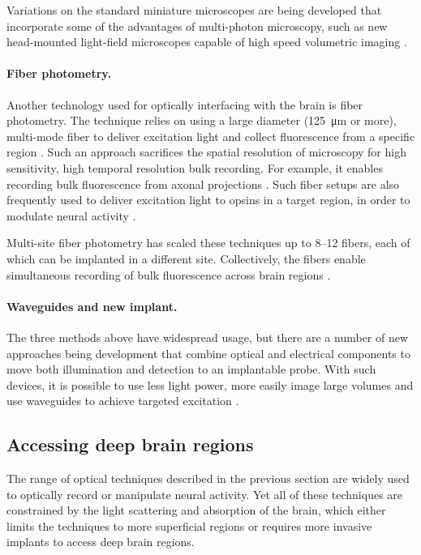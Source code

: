 Variations on the standard miniature microscopes are being 
developed that incorporate some of the advantages of multi-photon
microscopy, such as new head-mounted light-field microscopes 
capable of high speed volumetric imaging \cite{Skocek:2018hs}.

\paragraph{Fiber photometry.} Another technology used 
for optically interfacing with the brain is fiber photometry. 
The technique relies on using a large diameter 
(125~\si{\micro\meter} or more), multi-mode fiber to 
deliver excitation light and collect fluorescence from a 
specific region 
\cite{Adelsberger:2005dy,Cui:2013dq,Adelsberger:2014jd}.
Such an approach sacrifices the spatial resolution of 
microscopy for high sensitivity, high temporal resolution 
bulk recording. For example, it enables recording bulk 
fluorescence from axonal projections \cite{Gunaydin:2014dh}. 
Such fiber setups are also frequently used to deliver 
excitation light to opsins in a target region, in order
to modulate neural activity \cite{Warden:2014bx}.

Multi-site fiber photometry has scaled these techniques up to 
8--12 fibers, each of which can be implanted in a different site.
Collectively, the fibers enable simultaneous recording of bulk 
fluorescence across brain regions \cite{Guo:2015gu}.

\paragraph{Waveguides and new implant.} The three methods 
above have widespread usage, but there are a number of new 
approaches being development that combine optical and electrical 
components to move both illumination and detection to an implantable probe.
With such devices, it is possible to use less light power, 
more easily image large volumes and use waveguides to achieve 
targeted excitation \cite{Warden:2014bx,Wu:2015gk,Segev:2017en}.

\subsection{Accessing deep brain regions}

The range of optical techniques described in the previous 
section are widely used to optically record or manipulate 
neural activity. Yet all of these techniques are constrained 
by the light scattering and absorption of the brain, which 
either limits the techniques to more superficial regions or 
requires more invasive implants to access deep brain regions.

